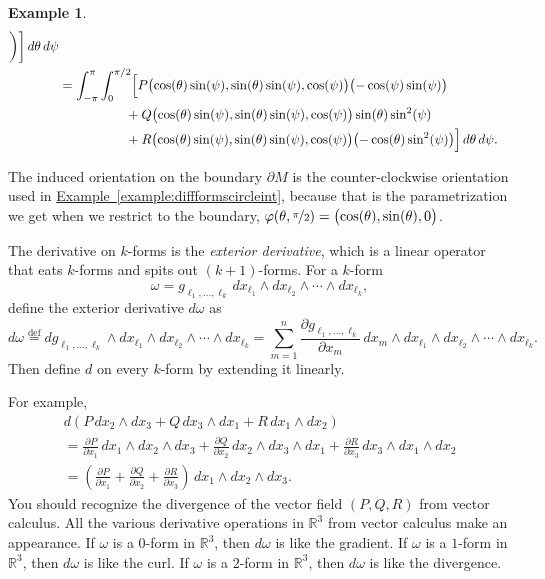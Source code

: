 \documentclass[12pt,openany]{book}
\newcommand{\R}{{\mathbb{R}}}
\newcommand{\myindex}[1]{#1\index{#1}}
\theoremstyle{plain}
\theoremstyle{remark}
\theoremstyle{definition}
\theoremstyle{exercise}
\theoremstyle{example}
\newtheorem{example}[thm]{Example}
\newcommand{\exampleref}[1]{\hyperref[#1]{Example~\ref*{#1}}}
\begin{document}
\begin{example}
\begin{equation*}
\begin{split}
\biggr)
\biggr]\, d\theta \, d\psi
\\
& =
\int_{-\pi}^\pi
\int_{0}^{\pi/2}
\Bigl[
P\bigl(\cos(\theta)\sin(\psi),\sin(\theta)\sin(\psi),\cos(\psi)\bigr)
\bigl(-\cos(\psi)\sin(\psi) \bigr)
\\
& \hspace{1.8cm}
+
Q\bigl(\cos(\theta)\sin(\psi),\sin(\theta)\sin(\psi),\cos(\psi)\bigr)
\sin(\theta)\sin^2(\psi)
\\
& \hspace{1.8cm}
+
R\bigl(\cos(\theta)\sin(\psi),\sin(\theta)\sin(\psi),\cos(\psi)\bigr)
\bigl(-\cos(\theta)\sin^2(\psi)\bigr)
\Bigr]
\,
d\theta
\,
d\psi .
\end{split}
\end{equation*}

The induced orientation on the boundary $\partial M$
is the counter-clockwise orientation used in
\exampleref{example:diffformscircleint},
because that is the parametrization we get when we restrict
to the boundary, $\varphi(\theta,\nicefrac{\pi}{2}) =
\bigl(\cos(\theta),\sin(\theta),0\bigr)$.
\end{example}

\medskip

The derivative on $k$-forms is the
\emph{\myindex{exterior derivative}},
which is a linear operator that eats $k$-forms and spits out
$(k+1)$-forms.  For a $k$-form
\begin{equation*}
\omega =
g_{\ell_1,\ldots,\ell_k}
\,
dx_{\ell_1} \wedge
dx_{\ell_2} \wedge
\cdots \wedge
dx_{\ell_k}  ,
\end{equation*}
define the exterior derivative $d\omega$ as
%
\begin{equation*}
d\omega
\overset{\text{def}}{=}
dg_{\ell_1,\ldots,\ell_k}
\wedge
dx_{\ell_1} \wedge
dx_{\ell_2} \wedge
\cdots \wedge
dx_{\ell_k}  =
\sum_{m=1}^n
\frac{\partial g_{\ell_1,\ldots,\ell_k}}{\partial x_m} \,
dx_m \wedge
dx_{\ell_1} \wedge
dx_{\ell_2} \wedge
\cdots \wedge
dx_{\ell_k} .
\end{equation*}
Then define $d$ on every $k$-form by extending it linearly.

For example,
\begin{multline*}
d \left(
P \, dx_2 \wedge dx_3
+
Q \, dx_3 \wedge dx_1
+
R \, dx_1 \wedge dx_2
\right)
\\
=
\frac{\partial P}{\partial x_1} \, dx_1 \wedge dx_2 \wedge dx_3
+
\frac{\partial Q}{\partial x_2} \, dx_2 \wedge dx_3 \wedge dx_1
+
\frac{\partial R}{\partial x_3} \, dx_3 \wedge dx_1 \wedge dx_2
\\
=
\left(
\frac{\partial P}{\partial x_1}
+
\frac{\partial Q}{\partial x_2}
+
\frac{\partial R}{\partial x_3}
\right) \, dx_1 \wedge dx_2 \wedge dx_3 .
\end{multline*}
You should recognize the divergence of the vector field $(P,Q,R)$ from vector
calculus.
All the various derivative operations in $\R^3$ from vector calculus make an
appearance.
If $\omega$ is a $0$-form in $\R^3$, then $d\omega$ is like the gradient.
If $\omega$ is a $1$-form in $\R^3$, then $d\omega$ is like the curl.
If $\omega$ is a $2$-form in $\R^3$, then $d\omega$ is like the divergence.
\end{document}
